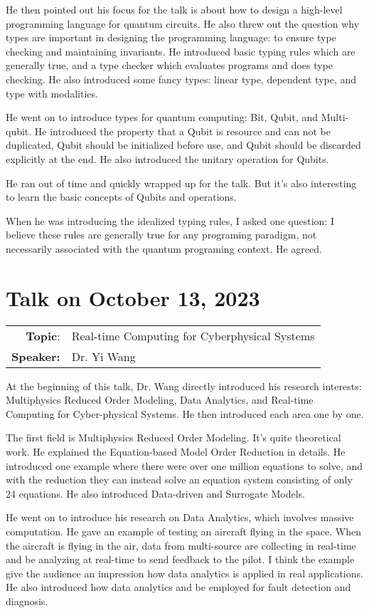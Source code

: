\documentclass[11pt, oneside]{article}   	%
\begin{document}
He then pointed out his focus for the talk is about how to design a high-level programming language for quantum circuits. He also threw out the question why types are important in designing the programming language: to ensure type checking and maintaining invariants. He introduced basic typing rules which are generally true, and a type checker which evaluates  programs and does type checking. He also introduced some fancy types: linear type, dependent type, and type with modalities.

He went on to introduce types for quantum computing: Bit, Qubit, and Multi-qubit. He introduced the property that a Qubit is resource and can not be duplicated, Qubit should be initialized before use, and Qubit should be discarded explicitly at the end. He also introduced the unitary operation for Qubits.

He ran out of time and quickly wrapped up for the talk. But it's also interesting to learn the basic concepts of Qubits and operations.

When he was introducing the idealized typing rules, I asked one question: I believe these rules are generally true for any programing paradigm, not necessarily associated with the quantum programing context. He agreed. 


\newpage
\section{Talk on October 13, 2023}
\begin{tabularx} {\textwidth}{r X}
\textbf{Topic}: & Real-time Computing for Cyberphysical Systems \\
\textbf{Speaker:} & Dr. Yi Wang\\
\end{tabularx}

At the beginning of this talk, Dr. Wang directly introduced his research interests: Multiphysics Reduced Order Modeling, Data Analytics, and Real-time Computing for Cyber-physical Systems. He then introduced each area one by one.

The first field is Multiphysics Reduced Order Modeling. It's quite theoretical work. He explained the Equation-based Model Order Reduction in details. He introduced one example where there were over one million equations to solve, and with the reduction they can instead solve an equation system consisting of only 24 equations. He also introduced Data-driven and Surrogate Models.

He went on to introduce his research on Data Analytics, which involves massive computation. He gave an example of testing an aircraft flying in the space. When the aircraft is flying in the air, data from multi-source are collecting in real-time and be analyzing at real-time to send feedback to the pilot. I think the example give the audience an impression how data analytics is applied in real applications. He also introduced how data analytics and be employed for fault detection and diagnosis.
\end{document}
